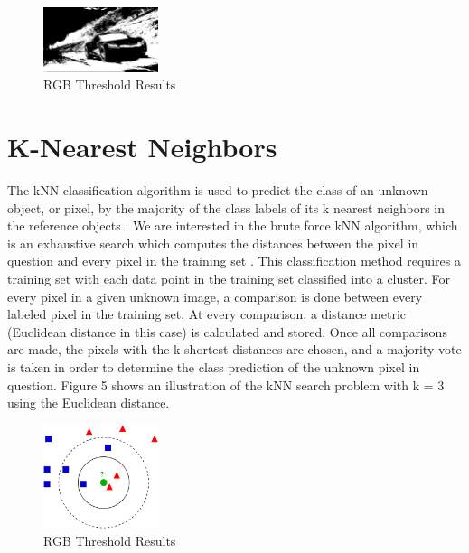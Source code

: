 \documentclass[conference]{IEEEtran}
\begin{document}
\begin{figure}[h]
\centering
\includegraphics[width=0.3\textwidth]{thresh_rgb}
\caption{RGB Threshold Results}
\end{figure}


\section{K-Nearest Neighbors}
The kNN classification algorithm is used to predict the class of an unknown object, or pixel, by the majority of the class labels of its k nearest neighbors in the reference objects \cite{GPUKNN1}. We are interested in the brute force kNN algorithm, which is an exhaustive search which computes the distances between the pixel in question and every pixel in the training set \cite{GPUKNN2}. This classification method requires a training set with each data point in the training set classified into a cluster. For every pixel in a given unknown image, a comparison is done between every labeled pixel in the training set. At every comparison, a distance metric (Euclidean distance in this case) is calculated and stored. Once all comparisons are made, the pixels with the k shortest distances are chosen, and a majority vote is taken in order to determine the class prediction of the unknown pixel in question. Figure 5 shows an illustration of the kNN search problem with k = 3 using the Euclidean distance.

\begin{figure}[h]
\centering
\includegraphics[width=0.3\textwidth]{knn}
\caption{RGB Threshold Results}
\end{figure}
\end{document}
